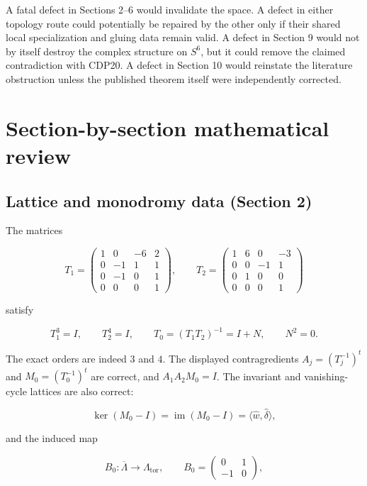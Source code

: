 \documentclass[
  10pt,
  letterpaper,
]{article}
\newcommand{\im}{\operatorname{im}}
\begin{document}
A fatal defect in Sections 2--6 would invalidate the space. A defect in
either topology route could potentially be repaired by the other only if
their shared local specialization and gluing data remain valid. A defect
in Section 9 would not by itself destroy the complex structure on
\(S^6\), but it could remove the claimed contradiction with CDP20. A
defect in Section 10 would reinstate the literature obstruction unless
the published theorem itself were independently corrected.

\section{Section-by-section mathematical
review}\label{section-by-section-mathematical-review}

\subsection{Lattice and monodromy data (Section
2)}\label{lattice-and-monodromy-data-section-2}

The matrices

\[
T_1=\begin{pmatrix}
1&0&-6&2\\0&-1&1&1\\0&-1&0&1\\0&0&0&1
\end{pmatrix},\qquad
T_2=\begin{pmatrix}
1&6&0&-3\\0&0&-1&1\\0&1&0&0\\0&0&0&1
\end{pmatrix}
\]

satisfy

\[
T_1^3=I,\qquad T_2^4=I,\qquad T_0=(T_1T_2)^{-1}=I+N,\qquad N^2=0.
\]

The exact orders are indeed \(3\) and \(4\). The displayed
contragredients \(A_j=(T_j^{-1})^t\) and \(M_0=(T_0^{-1})^t\) are
correct, and \(A_1A_2M_0=I\). The invariant and vanishing-cycle lattices
are also correct:

\[
\ker(M_0-I)=\im(M_0-I)=\langle\widehat w,\widehat\delta\rangle,
\]

and the induced map

\[
B_0:\overline\Lambda\to\Lambda_{\mathrm{tor}},\qquad
B_0=\begin{pmatrix}0&1\\-1&0\end{pmatrix},
\]
\end{document}
